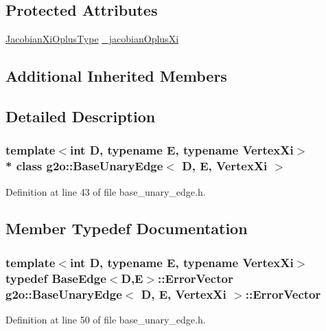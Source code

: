 \subsection*{Protected Attributes}
\begin{DoxyCompactItemize}
\item 
\hyperlink{classg2o_1_1BaseUnaryEdge_a24bcabd661223e15b7337f2835310f5e}{Jacobian\+Xi\+Oplus\+Type} \hyperlink{classg2o_1_1BaseUnaryEdge_af7d022a6c6c9c29dfd9147fce0dc13d8}{\+\_\+jacobian\+Oplus\+Xi}
\end{DoxyCompactItemize}
\subsection*{Additional Inherited Members}


\subsection{Detailed Description}
\subsubsection*{template$<$int D, typename E, typename Vertex\+Xi$>$\\*
class g2o\+::\+Base\+Unary\+Edge$<$ D, E, Vertex\+Xi $>$}



Definition at line 43 of file base\+\_\+unary\+\_\+edge.\+h.



\subsection{Member Typedef Documentation}
\subsubsection[{\texorpdfstring{Error\+Vector}{ErrorVector}}]{\setlength{\rightskip}{0pt plus 5cm}template$<$int D, typename E, typename Vertex\+Xi$>$ typedef {\bf Base\+Edge}$<$D,E$>$\+::{\bf Error\+Vector} {\bf g2o\+::\+Base\+Unary\+Edge}$<$ D, E, Vertex\+Xi $>$\+::{\bf Error\+Vector}}\hypertarget{classg2o_1_1BaseUnaryEdge_abc04cfacb65fc72825156f1b3346dd48}{}\label{classg2o_1_1BaseUnaryEdge_abc04cfacb65fc72825156f1b3346dd48}


Definition at line 50 of file base\+\_\+unary\+\_\+edge.\+h.

